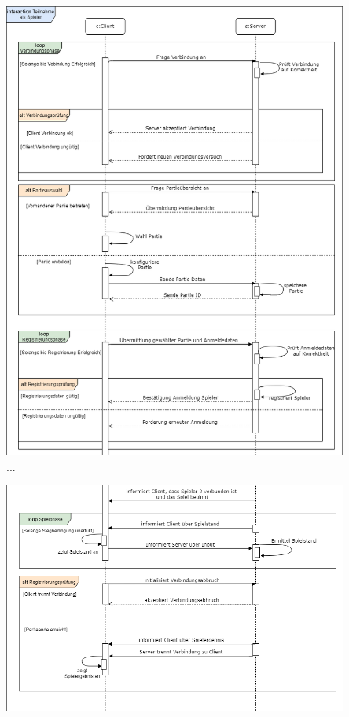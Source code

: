 \documentclass[12pt]{article}
\begin{document}
\begin{center}
\includegraphics[width=0.85\textwidth]{images/Teilnahme_als_Spieler2} \\ 
...
\end{center}

\begin{center}
\includegraphics[width=0.85\textwidth]{images/Teilnahme_als_Spieler}
\end{center}
\end{document}

